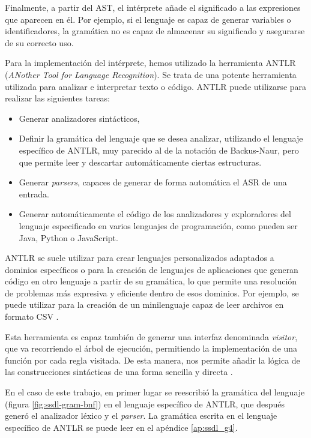\vspace{10pt}
Finalmente, a partir del AST, el intérprete añade el significado a las expresiones que aparecen en él. Por ejemplo,
si el lenguaje es capaz de generar variables o identificadores, la gramática no es capaz de almacenar su significado
y asegurarse de su correcto uso. 

\vspace{10pt}
Para la implementación del intérprete, hemos utilizado la herramienta ANTLR 
(\textit{ANother Tool for Language Recognition}). Se trata de una potente herramienta utilizada para analizar e
interpretar texto o código. ANTLR puede utilizarse para realizar las siguientes tareas:
\begin{itemize}
    \item Generar analizadores sintácticos,
    \item Definir la gramática del lenguaje que se desea analizar, utilizando el lenguaje específico de ANTLR, muy
    parecido al de la notación de Backus-Naur, pero que permite leer y descartar automáticamente ciertas estructuras.
    \item Generar \textit{parsers}, capaces de generar de forma automática el ASR de una entrada.
    \item Generar automáticamente el código de los analizadores y exploradores del lenguaje especificado en varios
    lenguajes de programación, como pueden ser Java, Python o JavaScript.
\end{itemize}
ANTLR se suele utilizar para crear lenguajes personalizados adaptados a dominios específicos o para la creación de
lenguajes de aplicaciones que generan código en otro lenguaje a partir de su gramática, lo que permite una 
resolución de problemas más expresiva y eficiente dentro de esos dominios. Por ejemplo, se puede utilizar para 
la creación de un minilenguaje capaz de leer archivos en formato CSV \cite{parr_2013}. 

\vspace{10pt}
Esta herramienta es capaz también de generar una interfaz denominada \textit{visitor}, que va recorriendo el árbol 
de ejecución, permitiendo la implementación de una función por cada regla visitada. De esta manera, nos permite 
añadir la lógica de las construcciones sintácticas de una forma sencilla y directa \cite{parr_2013}.

\vspace{10pt}
En el caso de este trabajo, en primer lugar se reescribió la gramática del lenguaje (figura \ref{fig:ssdl-gram-bnf})
en el lenguaje específico de ANTLR, que después generó el analizador léxico y el \textit{parser}. La gramática escrita 
en el lenguaje específico de ANTLR se puede leer en el apéndice \ref{ap:ssdl_g4}.

\endinput
